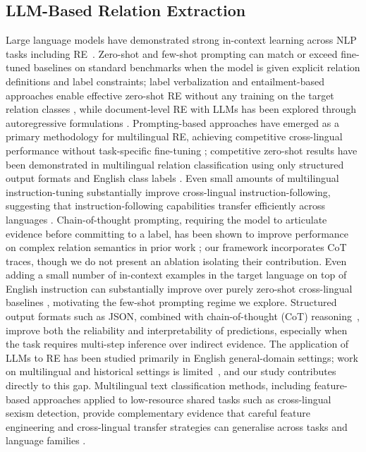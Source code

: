 \documentclass[
]{ceurart}
\theoremstyle{definition}
\begin{document}
\subsection{LLM-Based Relation Extraction}

Large language models have demonstrated strong in-context learning across NLP tasks including RE~\citep{brown2020language,wadhwa2023revisiting,achiam2023gpt}.
Zero-shot and few-shot prompting can match or exceed fine-tuned baselines on standard benchmarks when the model is given explicit relation definitions and label constraints; label verbalization and entailment-based approaches enable effective zero-shot RE without any training on the target relation classes \citep{sainz-etal-2021-label}, while document-level RE with LLMs has been explored through autoregressive formulations \citep{xue2024autore}.
Prompting-based approaches have emerged as a primary methodology for multilingual RE, achieving competitive cross-lingual performance without task-specific fine-tuning \citep{ali2025multilingual}; competitive zero-shot results have been demonstrated in multilingual relation classification using only structured output formats and English class labels \citep{cabot2023redfm}.
Even small amounts of multilingual instruction-tuning substantially improve cross-lingual instruction-following, suggesting that instruction-following capabilities transfer efficiently across languages \citep{shaham-etal-2024-multilingual}.
Chain-of-thought prompting, requiring the model to articulate evidence before committing to a label, has been shown to improve performance on complex relation semantics in prior work \citep{ali2025multilingual}; our framework incorporates CoT traces, though we do not present an ablation isolating their contribution.
Even adding a small number of in-context examples in the target language on top of English instruction can substantially improve over purely zero-shot cross-lingual baselines \citep{hennig2023multitacred}, motivating the few-shot prompting regime we explore.
Structured output formats such as JSON, combined with chain-of-thought (CoT) reasoning~\citep{wei2022chain}, improve both the reliability and interpretability of predictions, especially when the task requires multi-step inference over indirect evidence.
The application of LLMs to RE has been studied primarily in English general-domain settings; work on multilingual and historical settings is limited~\citep{Jinensibieke2024HowGA,swarup-etal-2025-llm4re,keinan2023jct,keinan2024text}, and our study contributes directly to this gap.
Multilingual text classification methods, including feature-based approaches applied to low-resource shared tasks such as cross-lingual sexism detection, provide complementary evidence that careful feature engineering and cross-lingual transfer strategies can generalise across tasks and language families \citep{keinan2024sexism,keinan2024tackling}.
\end{document}
